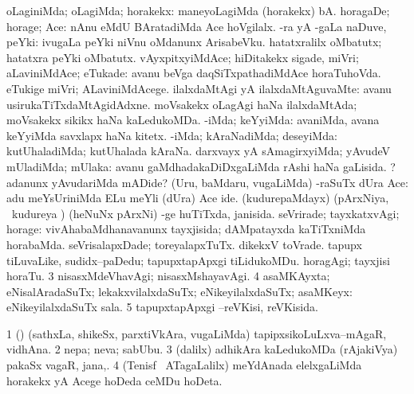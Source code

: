 \noindent
\gl{\pagu}
\bmng
\bnum
{}  
\banum
{} oLaginiMda; oLagiMda; horakekx:  maneyoLagiMda (horakekx) bA. 
 horagaDe; horage; Ace:  nAnu eMdU BAratadiMda Ace hoVgilalx. 
 -ra yA -gaLa naDuve, peYki:  ivugaLa peYki niVnu oMdanunx ArisabeVku.  hatatxralilx oMbatutx; hatatxra peYki oMbatutx. 
 vAyxpitxyiMdAce; hiDitakekx sigade, miVri; aLaviniMdAce; eTukade:  avanu beVga daqSiTxpathadiMdAce horaTuhoVda.  eTukige miVri; ALaviniMdAcege. 
 ilalxdaMtAgi yA ilalxdaMtAguvaMte:  avanu usirukaTiTxdaMtAgidAdxne.  moVsakekx oLagAgi haNa ilalxdaMtAda; moVsakekx sikikx haNa kaLedukoMDa. 
 -iMda; keYyiMda:  avaniMda, avana keYyiMda savxlapx haNa kitetx. 
 -iMda; kAraNadiMda; deseyiMda:  kutUhaladiMda; kutUhalada kAraNa. 
 darxvayx yA sAmagirxyiMda; yAvudeV mUladiMda; mUlaka:  avanu gaMdhadakaDiDxgaLiMda rAshi haNa gaLisida. ? adanunx yAvudariMda mADide? 
 (Uru, baMdaru, \mo vugaLiMda) -raSuTx dUra Ace:  adu meYsUriniMda ELu meYli (dUra) Ace ide. 
 (kudurepaMdayx) (pArxNiya, \kanmu\ kudureya \vi) (heNuNx pArxNi) -ge huTiTxda, janisida. 
\eanum
\numie
{}  
\banum
{} seVrirade; tayxkatxvAgi; horage:  vivAhabaMdhanavanunx tayxjisida; dAMpatayxda kaTiTxniMda horabaMda. 
 seVrisalapxDade; toreyalapxTuTx. 
 dikekxV toVrade. 
 tapupx tiLuvaLike, sudidx--paDedu; tapupxtapApxgi tiLidukoMDu. 
 horagAgi; tayxjisi horaTu. 
\eanum
\numie
\num{3}  nisasxMdeVhavAgi; nisasxMshayavAgi. 
\num{4}  asaMKAyxta; eNisalAradaSuTx; lekakxvilalxdaSuTx; eNikeyilalxdaSuTx; asaMKeyx:  eNikeyilalxdaSuTx sala. 
\num{5}  tapupxtapApxgi --reVKisi, reVKisida. 
\enum
\emng
\eentry

\bentry
{}
\gl{\nA}
\bmng
\bnum
\num{1} (\AmA) (sathxLa, shikeSx, parxtiVkAra, \mo vugaLiMda) tapipxsikoLuLxva--mAgaR, vidhAna. 
\num{2} nepa; neva; sabUbu. 
\hypertarget{out(3)3}{} 
\num{3} (\bava dalilx) adhikAra kaLedukoMDa (rAjakiVya) pakaSx vagaR, jana,. 
\num{4} (Tenisf \mo\ ATagaLalilx) meYdAnada elelxgaLiMda horakekx yA Acege hoDeda ceMDu hoDeta. 
\enum
\emng

